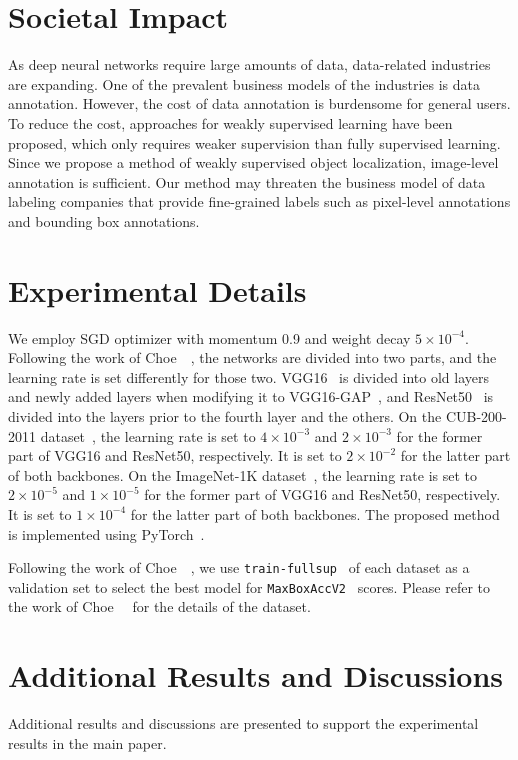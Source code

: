 \section{Societal Impact}
As deep neural networks require large amounts of data, data-related industries are expanding. One of the prevalent business models of the industries is data annotation. However, the cost of data annotation is burdensome for general users. To reduce the cost, approaches for weakly supervised learning have been proposed, which only requires weaker supervision than fully supervised learning. Since we propose a method of weakly supervised object localization, image-level annotation is sufficient. Our method may threaten the business model of data labeling companies that provide fine-grained labels such as pixel-level annotations and bounding box annotations.

\section{Experimental Details}
We employ SGD optimizer with momentum 0.9 and weight decay $5 \times 10^{-4}$. Following the work of \mbox{Choe~\etal~\cite{choe2020evaluation}}, the networks are divided into two parts, and the learning rate is set differently for those two. VGG16~\cite{simonyan2014very} is divided into old layers and newly added layers when modifying it to VGG16-GAP~\cite{zhou2016learning}, and ResNet50~\cite{he2016deep} is divided into the layers prior to the fourth layer and the others. On the CUB-200-2011 dataset~\cite{welinder2010caltech}, the learning rate is set to $4 \times 10^{-3}$ and $2 \times 10^{-3}$ for the former part of VGG16 and ResNet50, respectively. It is set to $2 \times 10^{-2}$ for the latter part of both backbones. On the ImageNet-1K dataset~\cite{russakovsky2015imagenet}, the learning rate is set to $2 \times 10^{-5}$ and $1 \times 10^{-5}$ for the former part of VGG16 and ResNet50, respectively. It is set to $1 \times 10^{-4}$ for the latter part of both backbones. The proposed method is implemented using PyTorch~\cite{paszke2017automatic}.

Following the work of Choe~\etal~\cite{choe2020evaluation}, we use \texttt{train-fullsup}~\cite{choe2020evaluation} of each dataset as a validation set to select the best model for \texttt{MaxBoxAccV2}~\cite{choe2020evaluation} scores. Please refer to the work of Choe~\etal~\cite{choe2020evaluation} for the details of the dataset.

\section{Additional Results and Discussions}
Additional results and discussions are presented to support the experimental results in the main paper.


